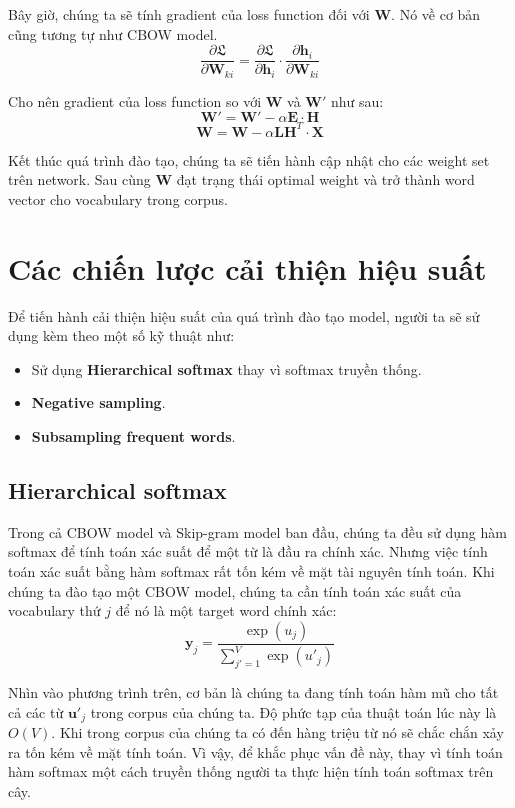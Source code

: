 \documentclass[12pt]{article}
\newcommand{\itemsizePaddingLeft}{\setlength{\itemindent}{0.6cm}}
\begin{document}
\indent Bây giờ, chúng ta sẽ tính gradient của loss function đối với $\boldsymbol{W}$. Nó về cơ bản cũng tương tự như CBOW model.
$$\dfrac{\partial \mathfrak{L}}{\partial \boldsymbol{W}_{ki}} = \dfrac{\partial \mathfrak{L}}{\partial \boldsymbol{h}_i} \cdot \dfrac{\partial \boldsymbol{h}_i}{\partial \boldsymbol{W}_{ki}}$$

\indent Cho nên gradient của loss function so với $\boldsymbol{W}$ và $\boldsymbol{W'}$ như sau:
$$\boldsymbol{W'} = \boldsymbol{W'} - \alpha \boldsymbol{E} \cdot \boldsymbol{H}$$
$$\boldsymbol{W} = \boldsymbol{W} - \alpha \boldsymbol{LH}^T \cdot \boldsymbol{X}$$

\indent Kết thúc quá trình đào tạo, chúng ta sẽ tiến hành cập nhật cho các weight set trên network. Sau cùng $\boldsymbol{W}$ đạt trạng thái optimal weight và trở thành word vector cho vocabulary trong corpus.

\section{Các chiến lược cải thiện hiệu suất}
Để tiến hành cải thiện hiệu suất của quá trình đào tạo model, người ta sẽ sử dụng kèm theo một số kỹ thuật như:
\begin{itemize}
  \itemsizePaddingLeft
  \item Sử dụng \textbf{Hierarchical softmax} thay vì softmax truyền thống.
  \item \textbf{Negative sampling}.
  \item \textbf{Subsampling frequent words}.
\end{itemize}

\subsection{Hierarchical softmax}
Trong cả CBOW model và Skip-gram model ban đầu, chúng ta đều sử dụng hàm softmax để tính toán xác suất để một từ là đầu ra chính xác. Nhưng việc tính toán xác suất bằng hàm softmax rất tốn kém về mặt tài nguyên tính toán. Khi chúng ta đào tạo một CBOW model, chúng ta cần tính toán xác suất của vocabulary thứ $j$ để nó là một target word chính xác:
$$\boldsymbol{y}_j = \dfrac{\exp{(u_j)}}{\sum^V_{j'=1} \exp{(u'_j)}}$$

\indent Nhìn vào phương trình trên, cơ bản là chúng ta đang tính toán hàm mũ cho tất cả các từ $\boldsymbol{u'}_j$ trong corpus của chúng ta. Độ phức tạp của thuật toán lúc này là $O(V)$. Khi trong corpus của chúng ta có đến hàng triệu từ nó sẽ chắc chắn xảy ra tốn kém về mặt tính toán. Vì vậy, để khắc phục vấn đề này, thay vì tính toán hàm softmax một cách truyền thống người ta thực hiện tính toán softmax trên cây.\\
\end{document}
